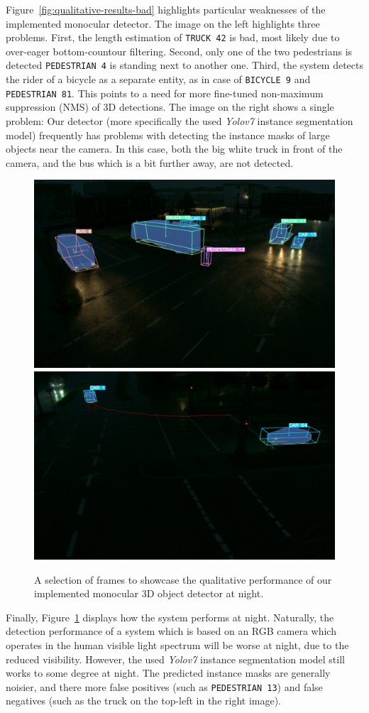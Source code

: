 Figure~\ref{fig:qualitative-results-bad} highlights particular weaknesses of the implemented monocular detector.
The image on the left highlights three problems.
First, the length estimation of \texttt{TRUCK 42} is bad, most likely due to over-eager bottom-countour filtering.
Second, only one of the two pedestrians is detected \textemdash \texttt{PEDESTRIAN 4} is standing next to another one.
Third, the system detects the rider of a bicycle as a separate entity, as in case of \texttt{BICYCLE 9} and \texttt{PEDESTRIAN 81}.
This points to a need for more fine-tuned non-maximum suppression (NMS) of 3D detections.
The image on the right shows a single problem: Our detector (more specifically the used \textit{Yolov7} instance segmentation model) frequently has problems with detecting the instance masks of large objects near the camera.
In this case, both the big white truck in front of the camera, and the bus which is a bit further away, are not detected.

\begin{figure}[htb]
    \includegraphics[width=0.499\linewidth]{
        figures/selection/1653330059.588901912.s110.camera.basler.south2.8mm}
    \includegraphics[width=0.499\linewidth]{
        figures/selection/1653330064.207615030.s110.camera.basler.south1.8mm}
    \caption{A selection of frames to showcase the qualitative performance of our implemented monocular 3D object detector at night.}
    \label{fig:qualitative-results-night}
\end{figure}

Finally, Figure~\ref{fig:qualitative-results-night} displays how the system performs at night.
Naturally, the detection performance of a system which is based on an RGB camera which operates in the human visible light spectrum will be worse at night, due to the reduced visibility.
However, the used \textit{Yolov7} instance segmentation model still works to some degree at night.
The predicted instance masks are generally noisier, and there more false positives (such as \texttt{PEDESTRIAN 13}) and false negatives (such as the truck on the top-left in the right image).


